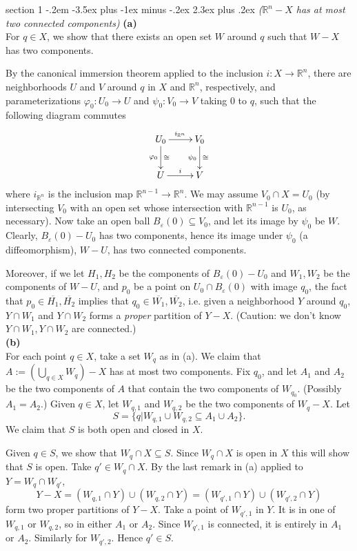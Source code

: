 \documentclass[12pt]{article}
\makeatletter
\theoremstyle{norm}
\newcommand{\R}[0]{\mathbb{R}}
\newcommand{\subeq}[0]{\subseteq}
\newcommand{\ep}[0]{\varepsilon}
\newcommand{\ph}[0]{\varphi}
\newcommand{\pa}[1]{\left( {#1} \right)}
\newcommand{\subprob}[1]{\noindent\textbf{#1}\\}
\newcommand{\ol}[1]{\overline{#1}}
\newenvironment{problem}{\@startsection
       {section}
       {1}
       {-.2em}
       {-3.5ex plus -1ex minus -.2ex}
       {2.3ex plus .2ex}
       {\pagebreak[3]%
       \large\bf\noindent{Problem }
       }
       }
       {%
       }
\makeatother
\begin{document}
\begin{problem}{\it ($\R^n-X$ has at most two connected components)}
\subprob{(a)}
For $q\in X$, we show that there exists an open set $W$ around $q$ such that $W-X$ has two components.

By the canonical immersion theorem applied to the inclusion $i:X\to \R^n$, 
there are
neighborhoods $U$ and $V$ around $q$ in $X$ and $\R^n$, respectively, and 
parameterizations $\ph_0:U_0\to U$ and $\psi_0:V_0\to V$ taking 0 to $q$, %
such that the following diagram commutes
\[
\xymatrix{
U_0\ar[r]^{i_{\R^n}}\ar[d]^{\cong}_{\ph_0}
& V_0\ar[d]^{\cong}_{\psi_0}\\
U\ar[r]^i & V
}
\]
where $i_{\R^n}$ is the inclusion map $\R^{n-1}\to \R^n$. %
We may assume $V_0\cap X=U_0$ (by intersecting $V_0$ with an open set whose intersection with $\R^{n-1}$ is $U_0$, as necessary). %
Now take an open ball $B_{\ep}(0)\subeq V_0$, and let its image by $\psi_0$ be $W$. Clearly, $B_{\ep}(0)-U_0$ has two components, hence its image under $\psi_0$ (a diffeomorphism), $W-U$, has two connected components.

Moreover, if we let $H_1,H_2$ be the components of $B_{\ep}(0)-U_0$ and $W_1,W_2$ be the components of $W-U$, and $p_0$ be a point on $U_0\cap B_{\ep}(0)$ with image $q_0$, 
the fact that $p_0\in \ol{H_1},\ol{H_2}$ implies that $q_0\in \ol{W_1},\ol{W_2}$, i.e. given a neighborhood $Y$ around $q_0$, $Y\cap W_1$ and $Y\cap W_2$ forms a {\it proper} partition of $Y-X$. (Caution: we don't know $Y\cap W_1,Y\cap W_2$ are connected.)\\

\subprob{(b)}
For each point $q\in X$, take a set $W_q$ as in (a). We claim that $A:=\pa{\bigcup_{q\in X} W_q}-X$ has at most two components. Fix $q_0$, and let $A_1$ and $A_2$ be the two components of $A$ that contain the two components of $W_{q_0}$. (Possibly $A_1=A_2$.) 
Given $q\in X$, let $W_{q,1}$ and $W_{q,2}$ be the two components of $W_q-X$.
Let
\[
S=\{q| W_{q,1}\cup W_{q,2}\subeq A_1\cup A_2\}.
\]
We claim that $S$ is both open and closed in $X$.

Given $q\in S$, we show that $W_q\cap X\subeq S$. Since $W_q\cap X$ is open in $X$ this will show that $S$ is open. Take $q'\in W_q\cap X$. By the last remark in (a) %
applied to $Y=W_q\cap W_{q'}$, 
\[
Y-X=(W_{q,1}\cap Y)\cup(W_{q,2}\cap Y)=(W_{q',1}\cap Y)\cup (W_{q',2}\cap Y)
\]
form two proper partitions of $Y-X$. Take a point of $W_{q',1}$ in $Y$. It is in one of $W_{q,1}$ or $W_{q,2}$, so in either $A_1$ or $A_2$. %
Since $W_{q',1}$ is connected, it is entirely in $A_1$ or $A_2$. Similarly for $W_{q',2}$. Hence $q'\in S$.


\end{problem}
\end{document}
